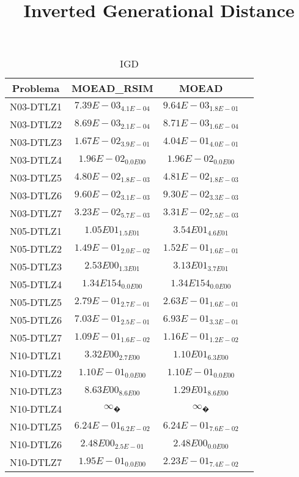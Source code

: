 \documentclass{article}
\title{Inverted Generational Distance}
\author{}
\begin{document}
\maketitle
\begin{table*}[ht!]
\scriptsize
\caption{IGD}
\centering\begin{tabular}{|c||c||c||c|} \hline
Problema &MOEAD_RSIM &MOEAD\\\hline
N03-DTLZ1 &\cellcolor{gray95}$7.39E-03_{4.1E-04}$ &\cellcolor{gray25}$9.64E-03_{1.8E-01}$\\ 
\hline
N03-DTLZ2 &\cellcolor{gray95}$8.69E-03_{2.1E-04}$ &\cellcolor{gray25}$8.71E-03_{1.6E-04}$\\ 
\hline
N03-DTLZ3 &\cellcolor{gray95}$1.67E-02_{3.9E-01}$ &\cellcolor{gray25}$4.04E-01_{4.0E-01}$\\ 
\hline
N03-DTLZ4 &\cellcolor{gray95}$1.96E-02_{0.0E00}$ &\cellcolor{gray25}$1.96E-02_{0.0E00}$\\ 
\hline
N03-DTLZ5 &\cellcolor{gray95}$4.80E-02_{1.8E-03}$ &\cellcolor{gray25}$4.81E-02_{1.8E-03}$\\ 
\hline
N03-DTLZ6 &\cellcolor{gray25}$9.60E-02_{3.1E-03}$ &\cellcolor{gray95}$9.30E-02_{3.3E-03}$\\ 
\hline
N03-DTLZ7 &\cellcolor{gray95}$3.23E-02_{5.7E-03}$ &\cellcolor{gray25}$3.31E-02_{7.5E-03}$\\ 
\hline
N05-DTLZ1 &\cellcolor{gray95}$1.05E01_{1.5E01}$ &\cellcolor{gray25}$3.54E01_{4.6E01}$\\ 
\hline
N05-DTLZ2 &\cellcolor{gray95}$1.49E-01_{2.0E-02}$ &\cellcolor{gray25}$1.52E-01_{1.6E-01}$\\ 
\hline
N05-DTLZ3 &\cellcolor{gray95}$2.53E00_{1.3E01}$ &\cellcolor{gray25}$3.13E01_{3.7E01}$\\ 
\hline
N05-DTLZ4 &\cellcolor{gray95}$1.34E154_{0.0E00}$ &\cellcolor{gray25}$1.34E154_{0.0E00}$\\ 
\hline
N05-DTLZ5 &\cellcolor{gray25}$2.79E-01_{2.7E-01}$ &\cellcolor{gray95}$2.63E-01_{1.6E-01}$\\ 
\hline
N05-DTLZ6 &\cellcolor{gray25}$7.03E-01_{2.5E-01}$ &\cellcolor{gray95}$6.93E-01_{3.3E-01}$\\ 
\hline
N05-DTLZ7 &\cellcolor{gray95}$1.09E-01_{1.6E-02}$ &\cellcolor{gray25}$1.16E-01_{1.2E-02}$\\ 
\hline
N10-DTLZ1 &\cellcolor{gray95}$3.32E00_{2.7E00}$ &\cellcolor{gray25}$1.10E01_{6.3E00}$\\ 
\hline
N10-DTLZ2 &\cellcolor{gray95}$1.10E-01_{0.0E00}$ &\cellcolor{gray25}$1.10E-01_{0.0E00}$\\ 
\hline
N10-DTLZ3 &\cellcolor{gray95}$8.63E00_{8.6E00}$ &\cellcolor{gray25}$1.29E01_{8.6E00}$\\ 
\hline
N10-DTLZ4 &\cellcolor{gray25}$∞_{�}$ &$∞_{�}$\\ 
\hline
N10-DTLZ5 &\cellcolor{gray95}$6.24E-01_{6.2E-02}$ &\cellcolor{gray25}$6.24E-01_{7.6E-02}$\\ 
\hline
N10-DTLZ6 &\cellcolor{gray25}$2.48E00_{2.5E-01}$ &\cellcolor{gray95}$2.48E00_{0.0E00}$\\ 
\hline
N10-DTLZ7 &\cellcolor{gray95}$1.95E-01_{0.0E00}$ &\cellcolor{gray25}$2.23E-01_{7.4E-02}$\\ 
\hline
\end{tabular}
\end{table*}
\end{document}
